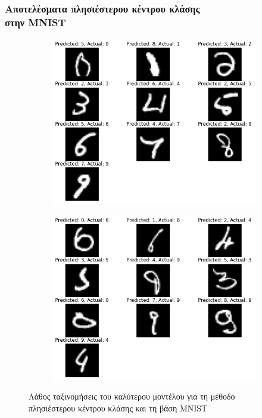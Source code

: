 \documentclass{beamer}
\begin{document}
\begin{frame}
\frametitle{Αποτελέσματα πλησιέστερου κέντρου κλάσης\\στην MNIST}

\begin{figure}[H]
    \centering

    \begin{subfigure}[t]{0.48\linewidth}
    \includegraphics[width=\linewidth]{mnist/wrong_results_nc_1.png}
    \end{subfigure}
    \begin{subfigure}[t]{0.48\linewidth}
    \includegraphics[width=\linewidth]{mnist/wrong_results_nc_2.png}
    \end{subfigure}

    \caption{Λάθος ταξινομήσεις του καλύτερου μοντέλου για τη μέθοδο
    πλησιέστερου κέντρου κλάσης και τη βάση MNIST}
    \label{fig:mnist_wrong_nc}
\end{figure}

\end{frame}
\end{document}
